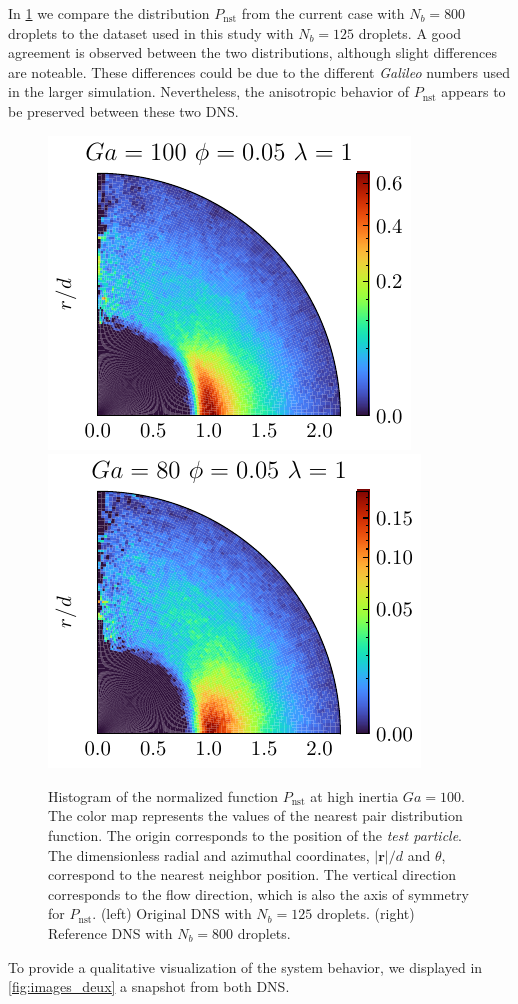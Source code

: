 In \ref{fig:Pnst_large_domain} we compare the distribution $P_\text{nst}$ from the current case with $N_b =800$ droplets to the dataset used in this study with $N_b = 125$ droplets.
A good agreement is observed between the two distributions, although slight differences are noteable.
These differences could be due to the different \textit{Galileo} numbers used in the larger simulation.
Nevertheless, the anisotropic behavior of $P_\text{nst}$ appears to be preserved between these two DNS.   
\begin{figure}[h!]
    \centering
    \includegraphics[height=0.205\textwidth]{image/HOMOGENEOUS_NEW/Dist/Pnst_l_1_Ga_100_PHI_0_05.pdf}
    \includegraphics[height=0.205\textwidth]{image/HOMOGENEOUS_final/Dist/Pnst_l_1_Ga_80_PHI_0_05.pdf}
    \caption{Histogram of the normalized function $P_\text{nst}$ at high inertia $Ga = 100$.
    The color map represents the values of the nearest pair distribution function. %
    The origin corresponds to the position of the \textit{\textit{test particle}}.
    The dimensionless radial and azimuthal coordinates, $|\textbf{r}|/d$ and $\theta$, correspond to the nearest neighbor position.
    The vertical direction corresponds to the flow direction, which is also the axis of symmetry for $P_\text{nst}$.
    (left) Original DNS with $N_b =125$ droplets.
    (right) Reference DNS with $N_b = 800$ droplets.}
    \label{fig:Pnst_large_domain}
\end{figure}
To provide a qualitative visualization of the system behavior, we displayed in \ref{fig:images_deux} a snapshot from both DNS. 

